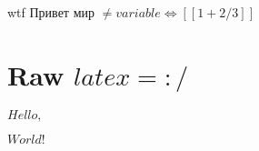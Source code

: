 wtf
\(\text{Привет }\allowbreak\text{мир }\allowbreak\neq variable \Leftrightarrow [[1 + 2 / 3]]\)

\section{Raw $latex = :/$}


\(Hello, \)\( World!\)



